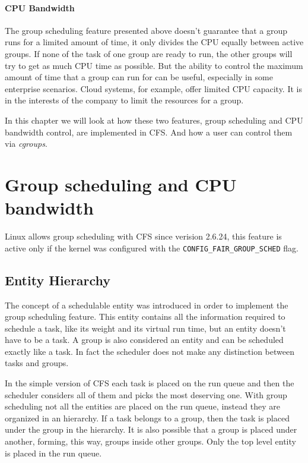 \paragraph{CPU Bandwidth}
The group scheduling feature presented above doesn't guarantee that a group runs for a limited amount of time, it only divides the CPU equally between active groups. If none of the task of one group are ready to run, the other groups will try to get as much CPU time as possible. But the ability to control the maximum amount of time that a group can run for can be useful, especially in some enterprise scenarios.  Cloud systems, for example, offer limited CPU capacity. It is in the interests of the company to limit the resources for a group.

In this chapter we will look at how these two features, group scheduling and CPU bandwidth control, are implemented in CFS. And how a user can control them via \textit{cgroups}.

\section{Group scheduling and CPU bandwidth}

Linux allows group scheduling with CFS since verision 2.6.24, this feature is active only if the kernel was configured with the \verb|CONFIG_FAIR_GROUP_SCHED| flag.

\subsection{Entity Hierarchy}

The concept of a schedulable entity was introduced in order to implement the group scheduling feature. This entity contains all the information required to schedule a task, like its weight and its virtual run time, but an entity doesn't have to be a task. A group is also considered an entity and can be scheduled exactly like a task. In fact the scheduler does not make any distinction between tasks and groups.

In the simple version of CFS each task is placed on the run queue and then the scheduler considers all of them and picks the most deserving one.
With group scheduling not all the entities are placed on the run queue, instead they are organized in an hierarchy. If a task belongs to a group, then the task is placed under the group in the hierarchy. It is also possible that a group is placed under another, forming, this way, groups inside other groups. Only the top level entity is placed in the run queue.

